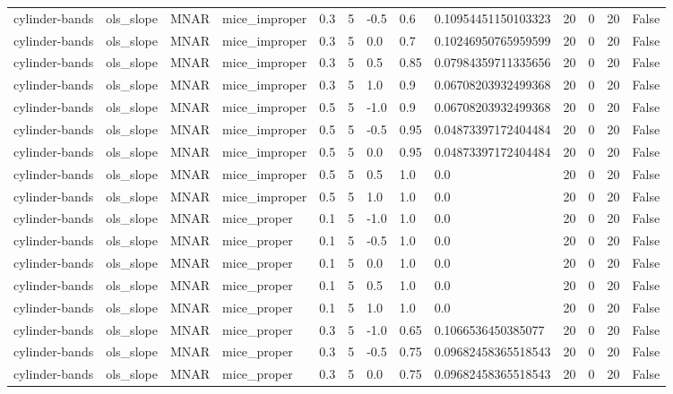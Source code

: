 \begin{tabular}{lllllllllllll}
cylinder-bands & ols\_slope & MNAR & mice\_improper & 0.3 & 5 & -0.5 & 0.6 & 0.10954451150103323 & 20 & 0 & 20 & False \\
cylinder-bands & ols\_slope & MNAR & mice\_improper & 0.3 & 5 & 0.0 & 0.7 & 0.10246950765959599 & 20 & 0 & 20 & False \\
cylinder-bands & ols\_slope & MNAR & mice\_improper & 0.3 & 5 & 0.5 & 0.85 & 0.07984359711335656 & 20 & 0 & 20 & False \\
cylinder-bands & ols\_slope & MNAR & mice\_improper & 0.3 & 5 & 1.0 & 0.9 & 0.06708203932499368 & 20 & 0 & 20 & False \\
cylinder-bands & ols\_slope & MNAR & mice\_improper & 0.5 & 5 & -1.0 & 0.9 & 0.06708203932499368 & 20 & 0 & 20 & False \\
cylinder-bands & ols\_slope & MNAR & mice\_improper & 0.5 & 5 & -0.5 & 0.95 & 0.04873397172404484 & 20 & 0 & 20 & False \\
cylinder-bands & ols\_slope & MNAR & mice\_improper & 0.5 & 5 & 0.0 & 0.95 & 0.04873397172404484 & 20 & 0 & 20 & False \\
cylinder-bands & ols\_slope & MNAR & mice\_improper & 0.5 & 5 & 0.5 & 1.0 & 0.0 & 20 & 0 & 20 & False \\
cylinder-bands & ols\_slope & MNAR & mice\_improper & 0.5 & 5 & 1.0 & 1.0 & 0.0 & 20 & 0 & 20 & False \\
cylinder-bands & ols\_slope & MNAR & mice\_proper & 0.1 & 5 & -1.0 & 1.0 & 0.0 & 20 & 0 & 20 & False \\
cylinder-bands & ols\_slope & MNAR & mice\_proper & 0.1 & 5 & -0.5 & 1.0 & 0.0 & 20 & 0 & 20 & False \\
cylinder-bands & ols\_slope & MNAR & mice\_proper & 0.1 & 5 & 0.0 & 1.0 & 0.0 & 20 & 0 & 20 & False \\
cylinder-bands & ols\_slope & MNAR & mice\_proper & 0.1 & 5 & 0.5 & 1.0 & 0.0 & 20 & 0 & 20 & False \\
cylinder-bands & ols\_slope & MNAR & mice\_proper & 0.1 & 5 & 1.0 & 1.0 & 0.0 & 20 & 0 & 20 & False \\
cylinder-bands & ols\_slope & MNAR & mice\_proper & 0.3 & 5 & -1.0 & 0.65 & 0.1066536450385077 & 20 & 0 & 20 & False \\
cylinder-bands & ols\_slope & MNAR & mice\_proper & 0.3 & 5 & -0.5 & 0.75 & 0.09682458365518543 & 20 & 0 & 20 & False \\
cylinder-bands & ols\_slope & MNAR & mice\_proper & 0.3 & 5 & 0.0 & 0.75 & 0.09682458365518543 & 20 & 0 & 20 & False \\

\end{tabular}
